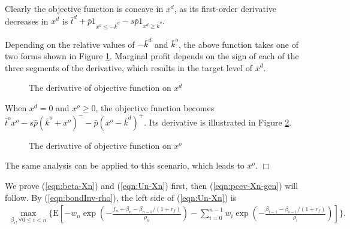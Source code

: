 \documentclass[mnsc,nonblindrev,copyedit]{informs2_wz} %
\newcommand{\E}{\mathrm{E}}
\newcommand{\qed}{ \hfill $\Box$ }
\begin{document}
Clearly the objective function is concave in $x^d$, as its first-order derivative decreases in $x^d$ is
    $\bar{t}^d +\bar{p}1_{x^d \leq -\bar{k}^d}-s\bar{p}1_{x^d \geq \bar{k}^o}.$

Depending on the relative values of $-\bar{k}^d$ and $\bar{k}^o$, the above function takes one of two forms shown in Figure \ref{figure:xdDeriveBasicModel}.  Marginal profit depends on the sign of each of the three segments of the derivative, which results in the target level of $\bar{x}^d$.
\begin{figure}[ht]
\begin{center}
\end{center}
    \caption{The derivative of objective function on $x^d$}
    \label{figure:xdDeriveBasicModel}
\end{figure}

When $x^d = 0$ and $x^o \geq 0$,  the objective function becomes $\bar{t}^o x^o - s\bar{p}(\bar{k}^o + x^o)^- - \bar{p}(x^o-\bar{k}^d)^+$.  Its derivative is illustrated in Figure \ref{figure:xoDeriveBasicModel}.
\begin{figure}[ht]
\begin{center}
\end{center}
    \caption{The derivative of objective function on $x^o$}
    \label{figure:xoDeriveBasicModel}
\end{figure}
The same analysis can be applied to this scenario, which leads to $\bar{x}^o$.  \qed

\medskip

We prove (\ref{eqn:beta-Xn}) and (\ref{eqn:Un-Xn}) first, then (\ref{eqn:pcev-Xn-gen}) will follow. By (\ref{eqn:bondInv-rho}), the left side of (\ref{eqn:Un-Xn}) is
\begin{eqnarray*}
\max_{\beta_i, \forall 0 \leq i < n}\{\E[ -w_n \exp( - \frac{f_n + \beta_n - \beta_{n-1}/(1+r_f)}{\rho_n}) - \sum_{i=0}^{n-1}w_i \exp (-\frac{\beta_{i-1} -\beta_{i-1}/(1+r_f)}{\rho_i}) ]\}.
\end{eqnarray*}
\end{document}
